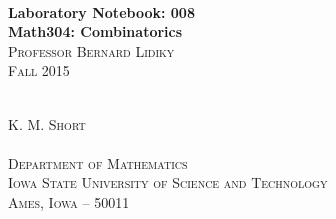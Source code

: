 \begin{titlepage}

\begin{center}
\hrulefill \\[0.05in]
\Large \textbf{Laboratory Notebook: 008} \\[0.05in]
\large \textbf{Math304: Combinatorics} \\[0.05in]
\normalsize \textsc{Professor Bernard Lidiky}\\[0.05in]
\small \textsc{Fall 2015} \\[0.05in]
\hrulefill \\
\vspace{5.0in}




\normalsize{\textsc{K. M. Short} } \\[0.02in]
\hrulefill \\[0.05in]
\normalsize \textsc{Department of Mathematics}\\[0.05in]
\normalsize \textsc{Iowa State University of Science and Technology}\\ [0.05in]
\small \textsc{Ames, Iowa -- 50011} \\[0.05in]
\end{center}

\end{titlepage}